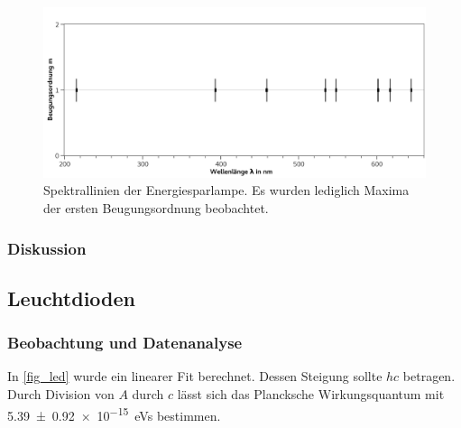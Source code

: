 \documentclass[
	a4paper,
	12pt,
	pagesize,
	ngerman
]{scrartcl}
\begin{document}
	\begin{figure}[H] 
		\includegraphics[width=1\textwidth]{fig_spar} 
		\centering
		\caption{Spektrallinien der Energiesparlampe. 
		Es wurden lediglich Maxima der ersten Beugungsordnung beobachtet.} %
		\label{fig_spar}
		\centering
	\end{figure}
	
	\subsubsection{Diskussion}
	

	\subsection{Leuchtdioden}
	\subsubsection{Beobachtung und Datenanalyse}
	In \cref{fig_led} wurde ein linearer Fit berechnet. 
	Dessen Steigung sollte $hc$ betragen.
	Durch Division von $A$ durch $c$ lässt sich das Plancksche Wirkungsquantum mit \SI{5,39 +- 0,92 e-15}{eVs} bestimmen.
\end{document}

